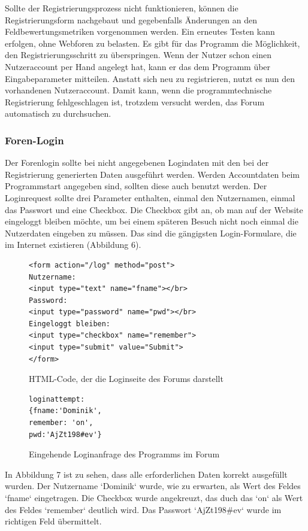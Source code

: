 Sollte der Registrierungsprozess nicht funktionieren, können die Registrierungsform nachgebaut und gegebenfalls Änderungen an den Feldbewertungsmetriken vorgenommen werden. Ein erneutes Testen kann erfolgen, ohne Webforen zu belasten. Es gibt für das Programm die Möglichkeit, den Registrierungsschritt zu überspringen. Wenn der Nutzer schon einen Nutzeraccount per Hand angelegt hat, kann er das dem Programm über Eingabeparameter mitteilen. Anstatt sich neu zu registrieren, nutzt es nun den vorhandenen Nutzeraccount. Damit kann, wenn die programmtechnische Registrierung fehlgeschlagen ist, trotzdem versucht werden, das Forum automatisch zu durchsuchen.

\subsubsection{Foren-Login}
Der Forenlogin sollte bei nicht angegebenen Logindaten mit den bei der Registrierung generierten Daten ausgeführt werden. Werden Accountdaten beim Programmstart angegeben sind, sollten diese auch benutzt werden. Der Loginrequest sollte drei Parameter enthalten, einmal den Nutzernamen, einmal das Passwort und eine Checkbox. Die Checkbox gibt an, ob man auf der Website eingeloggt bleiben möchte, um bei einem späteren Besuch nicht noch einmal die Nutzerdaten eingeben zu müssen. Das sind die gängigsten Login-Formulare, die im Internet existieren (Abbildung 6).

\begin{figure}[ht]
\begin{lstlisting}[language=HTML5]
<form action="/log" method="post">
Nutzername: 
<input type="text" name="fname"></br>
Password: 
<input type="password" name="pwd"></br>
Eingeloggt bleiben: 
<input type="checkbox" name="remember">
<input type="submit" value="Submit">
</form>
\end{lstlisting}
\caption{HTML-Code, der die Loginseite des Forums darstellt}
\end{figure}


\begin{figure}[h!]
\begin{lstlisting}[language=HTML5]
loginattempt: 
{fname:'Dominik',
remember: 'on',
pwd:'AjZt198#ev'}
\end{lstlisting}
\caption{Eingehende Loginanfrage des Programms im Forum}
\end{figure}

In Abbildung 7 ist zu sehen, dass alle erforderlichen Daten korrekt ausgefüllt wurden. Der Nutzername `Dominik` wurde, wie zu erwarten, als Wert des Feldes `fname` eingetragen. Die Checkbox wurde angekreuzt, das duch das `on` als Wert des Feldes `remember` deutlich wird. Das Passwort `AjZt198\#ev` wurde im richtigen Feld übermittelt.

